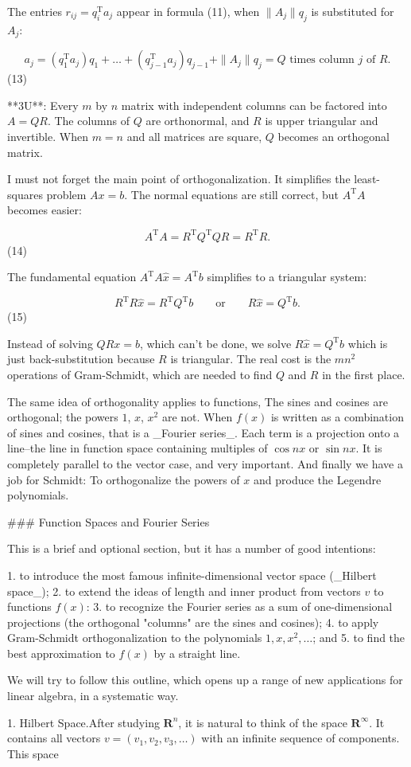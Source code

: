 The entries \(r_{ij}=q_{i}^{\mathrm{T}}a_{j}\) appear in formula (11), when \(\|A_{j}\|q_{j}\) is substituted for \(A_{j}\):

\[a_{j}=(q_{1}^{\mathrm{T}}a_{j})q_{1}+\dots+(q_{j-1}^{\mathrm{T}}a_{j})q_{j-1}+ \|A_{j}\|q_{j}=Q\text{ times column }j\text{ of }R.\] (13)

**3U**: Every \(m\) by \(n\) matrix with independent columns can be factored into \(A=QR\). The columns of \(Q\) are orthonormal, and \(R\) is upper triangular and invertible. When \(m=n\) and all matrices are square, \(Q\) becomes an orthogonal matrix.

I must not forget the main point of orthogonalization. It simplifies the least-squares problem \(Ax=b\). The normal equations are still correct, but \(A^{\mathrm{T}}A\) becomes easier:

\[A^{\mathrm{T}}A=R^{\mathrm{T}}Q^{\mathrm{T}}QR=R^{\mathrm{T}}R.\] (14)

The fundamental equation \(A^{\mathrm{T}}A\widehat{x}=A^{\mathrm{T}}b\) simplifies to a triangular system:

\[R^{\mathrm{T}}R\widehat{x}=R^{\mathrm{T}}Q^{\mathrm{T}}b\qquad\text{or} \qquad R\widehat{x}=Q^{\mathrm{T}}b.\] (15)

Instead of solving \(QRx=b\), which can't be done, we solve \(R\widehat{x}=Q^{\mathrm{T}}b\) which is just back-substitution because \(R\) is triangular. The real cost is the \(mn^{2}\) operations of Gram-Schmidt, which are needed to find \(Q\) and \(R\) in the first place.

The same idea of orthogonality applies to functions, The sines and cosines are orthogonal; the powers \(1\), \(x\), \(x^{2}\) are not. When \(f(x)\) is written as a combination of sines and cosines, that is a _Fourier series_. Each term is a projection onto a line--the line in function space containing multiples of \(\cos nx\) or \(\sin nx\). It is completely parallel to the vector case, and very important. And finally we have a job for Schmidt: To orthogonalize the powers of \(x\) and produce the Legendre polynomials.

### Function Spaces and Fourier Series

This is a brief and optional section, but it has a number of good intentions:

1. to introduce the most famous infinite-dimensional vector space (_Hilbert space_);
2. to extend the ideas of length and inner product from vectors \(v\) to functions \(f(x)\):
3. to recognize the Fourier series as a sum of one-dimensional projections (the orthogonal "columns" are the sines and cosines);
4. to apply Gram-Schmidt orthogonalization to the polynomials \(1,x,x^{2},\dots\); and
5. to find the best approximation to \(f(x)\) by a straight line.

We will try to follow this outline, which opens up a range of new applications for linear algebra, in a systematic way.

1. Hilbert Space.After studying \(\mathbf{R}^{n}\), it is natural to think of the space \(\mathbf{R}^{\infty}\). It contains all vectors \(v=(v_{1},v_{2},v_{3},\dots)\) with an infinite sequence of components. This space 
